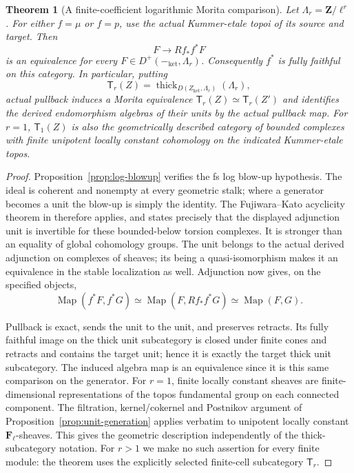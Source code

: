 \documentclass[11pt]{article}
\newtheorem{theorem}{Theorem}[section]
\theoremstyle{definition}
\theoremstyle{remark}
\newcommand{\thick}{\operatorname{thick}}
\begin{document}
\begin{theorem}[A finite-coefficient logarithmic Morita comparison]
\label{thm:log-refinement}
Let $\Lambda_r=\mathbf Z/\ell^r$.  For either $f=\mu$ or $f=p$, use
the actual Kummer-etale topoi of its source and target.  Then
\[
 F\longrightarrow Rf_*f^*F
\]
is an equivalence for every $F\in D^+(-_{\mathrm{ket}},\Lambda_r)$.
Consequently $f^*$ is fully faithful on this category.  In particular,
putting
\[
 \mathsf T_r(Z)=\thick_{D(Z_{\mathrm{ket}},\Lambda_r)}(\Lambda_r),
\]
actual pullback induces a Morita equivalence
$\mathsf T_r(Z)\simeq\mathsf T_r(Z')$ and identifies the derived
endomorphism algebras of their units by the actual pullback map.
For $r=1$, $\mathsf T_1(Z)$ is also the geometrically described category
of bounded complexes with finite unipotent locally constant cohomology
on the indicated Kummer-etale topos.
\end{theorem}
\begin{proof}
Proposition~\ref{prop:log-blowup} verifies the fs log blow-up hypothesis.
The ideal is coherent and nonempty at every geometric stalk; where a
generator becomes a unit the blow-up is simply the identity.  The
Fujiwara--Kato acyclicity theorem in
\cite[Theorem 6.2]{IllusieOverview} therefore applies, and states
precisely that the displayed adjunction unit is invertible for these
bounded-below torsion complexes.  It is stronger than an equality of
global cohomology groups.  The unit belongs to the actual derived
adjunction on complexes of sheaves; its being a quasi-isomorphism
makes it an equivalence in the stable localization as well.  Adjunction
now gives, on the specified objects,
\[
 \operatorname{Map}(f^*F,f^*G)
 \simeq\operatorname{Map}(F,Rf_*f^*G)
 \simeq\operatorname{Map}(F,G).
\]

Pullback is exact, sends the unit to the unit, and preserves retracts.
Its fully faithful image on the thick unit subcategory is closed under
finite cones and retracts and contains the target unit; hence it is
exactly the target thick unit subcategory.  The induced algebra map is
an equivalence since it is this same comparison on the generator.
For $r=1$, finite locally constant sheaves are finite-dimensional
representations of the topos fundamental group on each connected
component.  The filtration, kernel/cokernel and Postnikov argument of
Proposition~\ref{prop:unit-generation} applies verbatim to unipotent
locally constant $\mathbf F_\ell$-sheaves.  This gives the geometric
description independently of the thick-subcategory notation.
For $r>1$ we make no such assertion for every finite module: the theorem
uses the explicitly selected finite-cell subcategory $\mathsf T_r$.
\end{proof}
\end{document}
